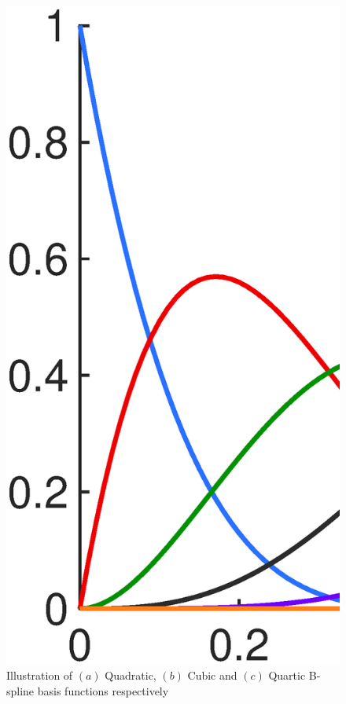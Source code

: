 \documentclass[3p,preprint,12pt]{elsarticle}
\begin{document}
\begin{figure}
\begin{minipage}{{.45\textwidth}}
	\end{minipage}\vspace{0.2cm}\\
	\begin{minipage}{{.45\textwidth}}
		\graphicspath{{./All_Images/}}
		\centering
		\includegraphics[width=\linewidth]{Quartic.eps}
	\end{minipage}
	\caption{Illustration of $(a)$ Quadratic,  $(b)$ Cubic and $(c)$ Quartic B-spline basis functions respectively}
	\label{fig:B-spline basis}
\end{figure}
\end{document}
